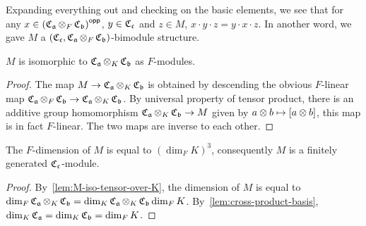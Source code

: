\begin{construction}[$M$]
Expanding everything out and checking on the basic elements, we see that for any $x \in \left(\operatorname{\mathfrak{C}}_{\mathfrak{a}}\otimes_{F}\operatorname{\mathfrak{C}}_{\mathfrak{b}}\right)^{\mathsf{opp}}$, $y \in \operatorname{\mathfrak{C}}_{\mathfrak{c}}$ and $z \in M$, $x \cdot y \cdot z = y \cdot x \cdot z$. In another word, we gave $M$ a $\left(\operatorname{\mathfrak{C}}_{\mathfrak{c}}, \operatorname{\mathfrak{C}}_{\mathfrak{a}} \otimes_{F} \operatorname{\mathfrak{C}}_{\mathfrak{b}}\right)$-bimodule structure.
  \leanok
\end{construction}


\begin{lemma}\label{lem:M-iso-tensor-over-K}
  $M$ is isomorphic to $\operatorname{\mathfrak{C}}_{\mathfrak{a}}\otimes_{K}\operatorname{\mathfrak{C}}_{\mathfrak{b}}$ as $F$-modules.
  \leanok
\end{lemma}
\begin{proof}
  The map $M \to \operatorname{\mathfrak{C}}_{\mathfrak{a}}\otimes_{K}\operatorname{\mathfrak{C}}_{\mathfrak{b}}$ is obtained by descending the obvious $F$-linear map $\operatorname{\mathfrak{C}}_{\mathfrak{a}}\otimes_{F}\operatorname{\mathfrak{C}}_{\mathfrak{b}}\to\operatorname{\mathfrak{C}}_{\mathfrak{a}}\otimes_{K}\operatorname{\mathfrak{C}}_{\mathfrak{b}}$.
  By universal property of tensor product, there is an additive group homomorphism $\operatorname{\mathfrak{C}}_{\mathfrak{a}}\otimes_{K}\operatorname{\mathfrak{C}}_{\mathfrak{b}} \to M$ given by $a \otimes b \mapsto [a\otimes b]$, this map is in fact $F$-linear. The two maps are inverse to each other.
\end{proof}

\begin{corollary}\label{cor:dim-finite-M}
  The $F$-dimension of $M$ is equal to ${\left(\dim_{F}K\right)}^{3}$, consequently $M$ is a finitely generated $\operatorname{\mathfrak{C}}_{\mathfrak{c}}$-module.
  \leanok
\end{corollary}
\begin{proof}
  By~\cref{lem:M-iso-tensor-over-K}, the dimension of $M$ is equal to $\dim_{F}\operatorname{\mathfrak{C}}_{\mathfrak{a}}\otimes_{K}\operatorname{\mathfrak{C}}_{\mathfrak{b}} = \dim_{K}\operatorname{\mathfrak{C}}_{\mathfrak{a}}\otimes_{K}\operatorname{\mathfrak{C}}_{\mathfrak{b}}\dim_{F}K$. By~\cref{lem:cross-product-basis}, $\dim_{K}\operatorname{\mathfrak{C}}_{\mathfrak{a}} = \dim_{K}\operatorname{\mathfrak{C}}_{\mathfrak{b}} = \dim_{F}K$.
\end{proof}

